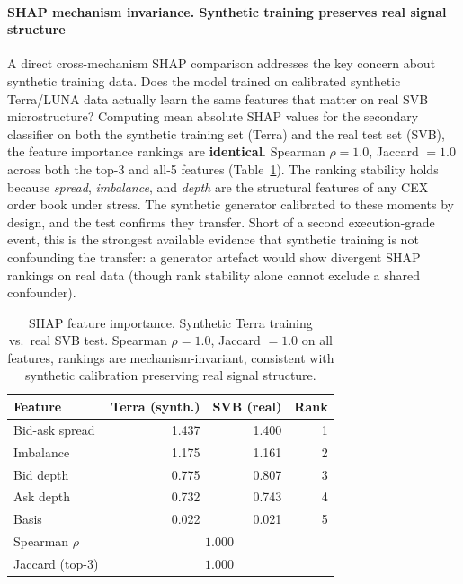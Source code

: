 \documentclass[sigconf,anonymous,natbib=false]{acmart}
\begin{document}
\paragraph{SHAP mechanism invariance. Synthetic training preserves real signal structure}
A direct cross-mechanism SHAP comparison addresses the key concern about synthetic training data.
Does the model trained on calibrated synthetic Terra/LUNA data actually learn the same features
that matter on real SVB microstructure?
Computing mean absolute SHAP values for the secondary classifier on both the synthetic training
set (Terra) and the real test set (SVB), the feature importance rankings are \textbf{identical}.
Spearman $\rho = 1.0$, Jaccard $= 1.0$ across both the top-3 and all-5 features
(Table~\ref{tab:shap_invariance}).
The ranking stability holds because \emph{spread}, \emph{imbalance}, and \emph{depth} are
the structural features of any CEX order book under stress. The synthetic generator
calibrated to these moments by design, and the test confirms they transfer.
Short of a second execution-grade event, this is the strongest available evidence that synthetic training is not confounding the transfer: a generator artefact would show divergent SHAP rankings on real data (though rank stability alone cannot exclude a shared confounder).

\begin{table}[h]
\centering
\caption{SHAP feature importance. Synthetic Terra training vs.\ real SVB test.
  Spearman $\rho=1.0$, Jaccard $=1.0$ on all features, rankings are mechanism-invariant,
  consistent with synthetic calibration preserving real signal structure.}
\label{tab:shap_invariance}
\setlength{\tabcolsep}{3pt}
{\small
\begin{tabular}{lrrr}
\toprule
\textbf{Feature} & \textbf{Terra (synth.)} & \textbf{SVB (real)} & \textbf{Rank} \\
\midrule
Bid-ask spread   & 1.437 & 1.400 & 1 \\
Imbalance        & 1.175 & 1.161 & 2 \\
Bid depth        & 0.775 & 0.807 & 3 \\
Ask depth        & 0.732 & 0.743 & 4 \\
Basis            & 0.022 & 0.021 & 5 \\
\midrule
Spearman $\rho$  & \multicolumn{3}{c}{$1.000$} \\
Jaccard (top-3)  & \multicolumn{3}{c}{$1.000$} \\
\bottomrule
\end{tabular}
}
\end{table}
\end{document}
